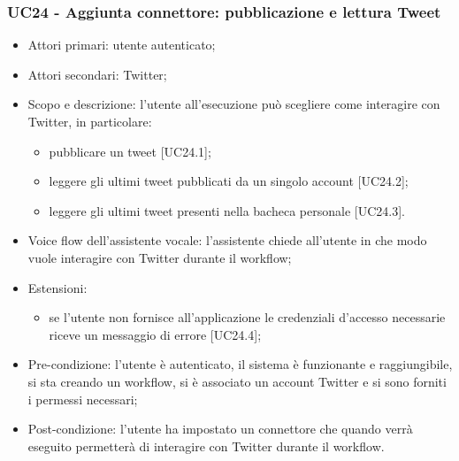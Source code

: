 \subsubsection{UC24 - Aggiunta connettore: pubblicazione e lettura Tweet}
\begin{itemize}
	\item  Attori primari: utente autenticato;
    \item  Attori secondari: Twitter;
	\item  Scopo e descrizione: l'utente all'esecuzione può scegliere come interagire con Twitter, in particolare:
		   \begin{itemize}
				\item pubblicare un tweet [UC24.1];
				\item leggere gli ultimi tweet pubblicati da un singolo account [UC24.2];
				\item leggere gli ultimi tweet presenti nella bacheca personale [UC24.3].
		   \end{itemize}
	\item  Voice flow dell'assistente vocale: l'assistente chiede all'utente in che modo vuole interagire con Twitter durante il workflow;
	\item  Estensioni: 
		   \begin{itemize}
				\item se l'utente non fornisce all'applicazione le credenziali d'accesso necessarie riceve un messaggio di errore [UC24.4];
		   \end{itemize}
	\item  Pre-condizione: l'utente è autenticato, il sistema è funzionante e raggiungibile, si sta creando un workflow, si è associato un account Twitter e si sono forniti i permessi necessari;
	\item  Post-condizione: l'utente ha impostato un connettore che quando verrà eseguito permetterà di interagire con Twitter durante il workflow.
\end{itemize}
